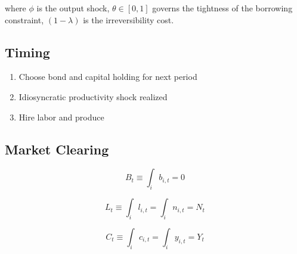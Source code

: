 \documentclass{article}
\begin{document}
where $\phi$ is the output shock, $\theta \in [0,1]$ governs the tightness of the borrowing constraint, $(1-\lambda)$ is the irreversibility cost.
\iffalse
\[k_{t+1} \leq (1+r)b_t - b_{t+1} + y_t + (1-\delta)k_t\]

\[k_{t+1} \leq (1+r)b_t + \theta\lambda(1-\delta)k_{t+1} + y_t + (1-\delta)k_t\]


\[k_{t+1}\Big(1-\theta\lambda(1-\delta)\Big) \leq (1+r)b_t + y_t + (1-\delta)k_t\]
\[k_{t+1} \leq \frac{(1+r)b_t + y_t + (1-\delta)k_t}{1-\theta\lambda(1-\delta)}\]
\fi
\subsection{Timing}
\begin{enumerate}
\item Choose bond and capital holding for next period
\item Idiosyncratic productivity shock realized
\item Hire labor and produce
\end{enumerate}

\subsection{Market Clearing}

\[ B_t \equiv \int_i b_{i,t}  =  0 \]

\[ L_t \equiv \int_i l_{i,t}  =  \int_i n_{i,t} = N_t \]

\[ C_t \equiv \int_i c_{i,t}  =  \int_i y_{i,t} = Y_t \]
\end{document}
